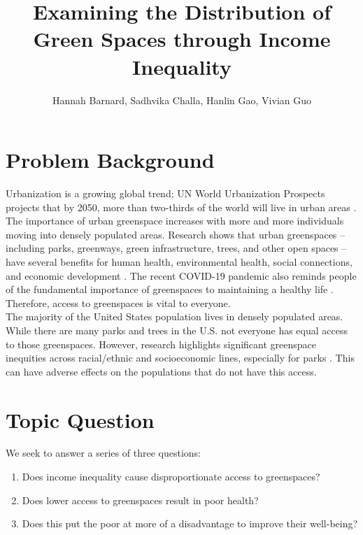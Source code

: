 \documentclass{article}
\title{Examining the Distribution of Green Spaces through Income Inequality}
\author{Hannah Barnard, Sadhvika Challa, Hanlin Gao, Vivian Guo}
\begin{document}
\maketitle


\section{Problem Background}

\setlength{\parindent}{0pt}

Urbanization is a growing global trend; UN World Urbanization Prospects projects that by 2050, more than two-thirds of the world will live in urban areas \cite{2}. The importance of urban greenspace increases with more and more individuals moving into densely populated areas. Research shows that urban greenspaces – including parks, greenways, green infrastructure, trees, and other open spaces – have several benefits for human health, environmental health, social connections, and economic development \cite{1}. The recent COVID-19 pandemic also reminds people of the fundamental importance of greenspaces to maintaining a healthy life \cite{3}. Therefore, access to greenspaces is vital to everyone. \\

The majority of the United States population lives in densely populated areas. While there are many parks and trees in the U.S. not everyone has equal access to those greenspaces. However, research highlights significant greenspace inequities across racial/ethnic and socioeconomic lines, especially for parks \cite{4}. This can have adverse effects on the populations that do not have this access.





\section{Topic Question}

We seek to answer a series of three questions:

\begin{enumerate}
    \item Does income inequality cause disproportionate access to greenspaces?
    \item Does lower access to greenspaces result in poor health?
    \item Does this put the poor at more of a disadvantage to improve their well-being?
\end{enumerate}
\end{document}
